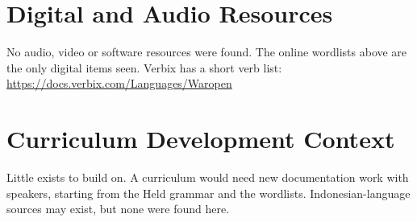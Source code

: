 \documentclass[12pt]{article}
\begin{document}
\section{Digital and Audio Resources}
No audio, video or software resources were found. The online wordlists above are the only digital items seen. Verbix has a short verb list: \url{https://docs.verbix.com/Languages/Waropen}

\section{Curriculum Development Context}
Little exists to build on. A curriculum would need new documentation work with speakers, starting from the Held grammar and the wordlists. Indonesian-language sources may exist, but none were found here.
\end{document}
